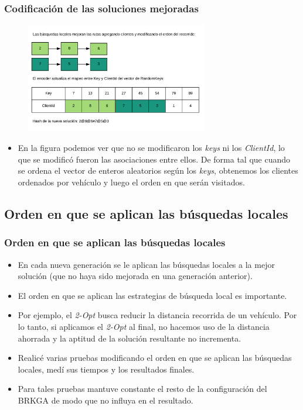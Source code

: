 \documentclass{beamer}
\begin{document}
\begin{frame}
\frametitle{Codificación de las soluciones mejoradas}

\begin{figure}[h]
	\centering
	\includegraphics[width=8cm]{codificacionDeSolucionParteDos}
	\label{fig:codificacionDeSolucionParteDos}
\end{figure}

\begin{itemize}
    \item En la figura podemos ver que no se modificaron los \textit{keys} ni los \textit{ClientId}, lo que se modificó fueron las asociaciones entre ellos. De forma tal que cuando se ordena el vector de enteros aleatorios según los \textit{keys}, obtenemos los clientes ordenados por vehículo y luego el orden en que serán visitados.
\end{itemize}

\end{frame}


\subsection{Orden en que se aplican las búsquedas locales}

\begin{frame}
\frametitle{Orden en que se aplican las búsquedas locales}

\begin{itemize}
    \item En cada nueva generación se le aplican las búsquedas locales a la mejor solución (que no haya sido mejorada en una generación anterior).
    \pause
    \item El orden en que se aplican las estrategias de búsqueda local es importante.
    \item Por ejemplo, el \textit{2-Opt} busca reducir la distancia recorrida de un vehículo. Por lo tanto, si aplicamos el \textit{2-Opt} al final, no hacemos uso de la distancia ahorrada y la aptitud de la solución resultante no incrementa.
    \pause
    \item Realicé varias pruebas modificando el orden en que se aplican las búsquedas locales, medí sus tiempos y los resultados finales.
    \item Para tales pruebas mantuve constante el resto de la configuración del BRKGA de modo que no influya en el resultado.
\end{itemize}

\end{frame}
\end{document}
